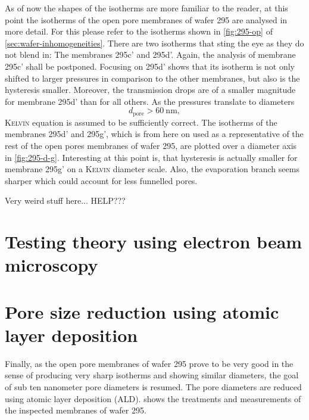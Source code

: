 \documentclass[../thesis.tex]{subfiles}
\begin{document}
        As of now the shapes of the isotherms are more familiar to the reader, at this point the isotherms of the open pore membranes of wafer 295 are analysed in more detail. For this please refer to the isotherms shown in \cref{fig:295-op} of \cref{sec:wafer-inhomogeneities}. There are two isotherms that sting the eye as they do not blend in: The membranes 295c' and 295d'. Again, the analysis of membrane 295c' shall be postponed. Focusing on 295d' shows that its isotherm is not only shifted to larger pressures in comparison to the other membranes, but also is the hysteresis smaller. Moreover, the transmission drops are of a smaller magnitude for membrane 295d' than for all others. As the pressures translate to diameters
        \begin{equation}
          d_\mathrm{pore}> \SI{60}{\nano\meter},
        \end{equation}
        \textsc{Kelvin} equation is assumed to be sufficiently correct. The isotherms of the membranes 295d' and 295g', which is from here on used as a representative of the rest of the open pores membranes of wafer 295, are plotted over a diameter axis in \cref{fig:295-d-g}. Interesting at this point is, that hysteresis is actually smaller for membrane 295g' on a \textsc{Kelvin} diameter scale. Also, the evaporation branch seems sharper which could account for less funnelled pores.
        \medskip

        Very weird stuff here... HELP???

        


      \section{Testing theory using electron beam microscopy}
      \label{sec:testing-theory}


      \section{Pore size reduction using atomic layer deposition}
      \label{sec:ald-experiments}

        Finally, as the open pore membranes of wafer 295 prove to be very good in the sense of producing very sharp isotherms and showing similar diameters, the goal of sub ten nanometer pore diameters is resumed. The pore diameters are reduced using atomic layer deposition (ALD).  shows the treatments and measurements of the inspected membranes of wafer 295.
\end{document}

